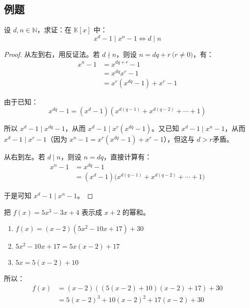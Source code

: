 \subsection{例题}

\begin{exercise}
	设 $d, n \in \mathbb N$，求证：在 $\mathbb K[x]$ 中：
	$$
	x^d - 1 \mid x^n - 1 \Longleftrightarrow d \mid n
	$$
\end{exercise}

\begin{proof}
	从左到右，用反证法。若 $d \nmid n$，则设 $n = dq + r \pod{r \ne 0}$，有：
	$$
	\begin{aligned}
		x^n - 1 &= x^{dq + r} - 1
		\\&=
		x^{dq} x^r - 1
		\\&=
		x^r(x^{dq} - 1) + x^r - 1
	\end{aligned}
	$$

	由于已知：
	$$
	x^{dq} - 1 = (x^d - 1)(x^{d(q - 1)} + x^{d(q - 2)} + \cdots + 1)
	$$

	所以 $x^d - 1 \mid x^{dq} - 1$，从而 $x^d - 1 \mid x^r(x^{dq} - 1)$。又已知 $x^d - 1 \mid x^n - 1$，从而 $x^d - 1 \mid x^r - 1$（因为 $x^n - 1 = x^r (x^{dq} - 1) + x^r - 1$），但这与 $d > r$​ 矛盾。

	\bigskip

	从右到左。若 $d \mid n$，则设 $n = dq$，直接计算有：
	$$
	\begin{aligned}
		x^n - 1 &= x^{dq} - 1
		\\&=
		(x^d - 1) \bigl( x^{d(q - 1)} + x^{d(q - 2)} + \cdots + 1 \bigr)
	\end{aligned}
	$$

	于是可知 $x^d - 1 \mid x^n - 1$。
\end{proof}

\begin{exercise}
	把 $f(x) = 5x^3 - 3x + 4$ 表示成 $x + 2$ 的幂和。
\end{exercise}

\begin{solve}
	\begin{enumerate}
		\item $f(x) = (x - 2)(5x^2 - 10x + 17) + 30$
		\item $5x^2 - 10x + 17 = 5x(x - 2) + 17$
		\item $5x = 5(x - 2) + 10$
	\end{enumerate}

	所以：
	$$
	\begin{aligned}
		f(x) &= (x - 2)((5(x - 2) + 10)(x - 2) + 17) + 30
		\\&=
		5(x - 2)^3 + 10(x - 2)^2 + 17(x - 2) + 30
	\end{aligned}
	$$
\end{solve}